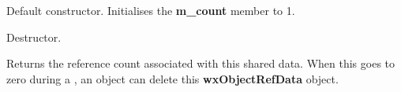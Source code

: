 




\label{wxobjectrefdatactor}


Default constructor. Initialises the {\bf m\_count} member to 1.

\label{wxobjectrefdatadtor}


Destructor.

\label{wxobjectrefdatagetrefcount}


Returns the reference count associated with this shared data.
When this goes to zero during a , an object
can delete this {\bf wxObjectRefData} object.

